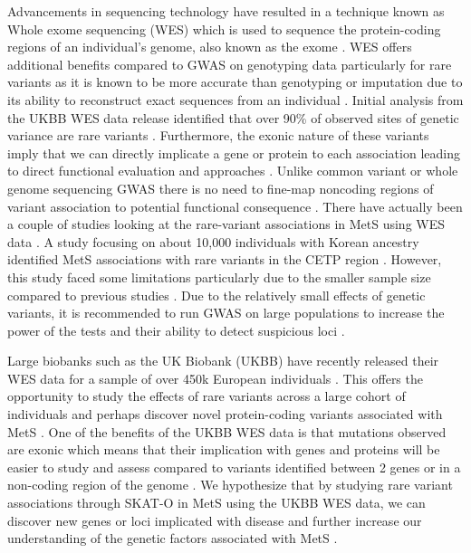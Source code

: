 \documentclass[11pt]{article}
\begin{document}
Advancements in sequencing technology have resulted in a technique known as Whole exome sequencing (WES) which is used to sequence the protein-coding regions of an individual's genome, also known as the exome \cite{pmid34662886}. WES offers additional benefits compared to GWAS on genotyping data particularly for rare variants as it is known to be more accurate than genotyping or imputation due to its ability to reconstruct exact sequences from an individual \cite{pmid34662886}. Initial analysis from the UKBB WES data release identified that over 90\% of observed sites of genetic variance are rare variants \cite{pmid34662886}. Furthermore, the exonic nature of these variants imply that we can directly implicate a gene or protein to each association leading to direct functional evaluation and approaches \cite{pmid34662886}. Unlike common variant or whole genome sequencing GWAS there is no need to fine-map noncoding regions of variant association to potential functional consequence \cite{pmid34662886,Uffelmann2021,doi:10.1056/NEJMoa2117872}. There have actually been a couple of studies looking at the rare-variant associations in MetS using WES data \cite{Lee2018}. A study focusing on about 10,000 individuals with Korean ancestry identified MetS associations with rare variants in the CETP region \cite{Lee2018}. However, this study faced some limitations particularly due to the smaller sample size compared to previous studies \cite{Lee2018}. Due to the relatively small effects of genetic variants, it is recommended to run GWAS on large populations to increase the power of the tests and their ability to detect suspicious loci \cite{Uffelmann2021}.

Large biobanks such as the UK Biobank (UKBB) have recently released their WES data for a sample of over 450k European individuals \cite{pmid34662886}. This offers the opportunity to study the effects of rare variants across a large cohort of individuals and perhaps discover novel protein-coding variants associated with MetS \cite{pmid34662886}. One of the benefits of the UKBB WES data is that mutations observed are exonic which means that their implication with genes and proteins will be easier to study and assess compared to variants identified between 2 genes or in a non-coding region of the genome \cite{pmid34662886,doi:10.1056/NEJMoa2117872}. We hypothesize that by studying rare variant associations through SKAT-O in MetS using the UKBB WES data, we can discover new genes or loci implicated with disease and further increase our understanding of the genetic factors associated with MetS \cite{pmid34662886,Zhou2022,KARCZEWSKI2022100168}.
\end{document}
